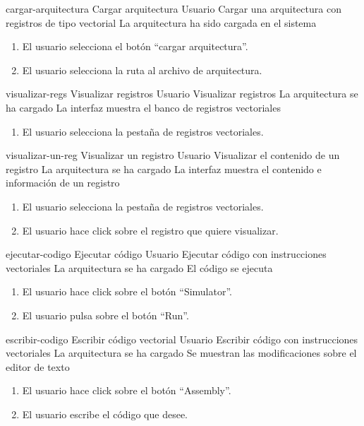\begin{useCase}{cargar-arquitectura}
  {Cargar arquitectura}
  {Usuario}
  {Cargar una arquitectura con registros de tipo vectorial}
  {\NA}
  {La arquitectura ha sido cargada en el sistema}
  \begin{enumerate}
    \item El usuario selecciona el botón ``cargar arquitectura''.
    \item El usuario selecciona la ruta al archivo de arquitectura.
  \end{enumerate}
\end{useCase}

\begin{useCase}{visualizar-regs}
  {Visualizar registros}
  {Usuario}
  {Visualizar registros}
  {La arquitectura se ha cargado}
  {La interfaz muestra el banco de registros vectoriales}
  \begin{enumerate}
    \item El usuario selecciona la pestaña de registros vectoriales.
  \end{enumerate}
\end{useCase}

\begin{useCase}{visualizar-un-reg}
  {Visualizar un registro}
  {Usuario}
  {Visualizar el contenido de un registro}
  {La arquitectura se ha cargado}
  {La interfaz muestra el contenido e información de un registro}
  \begin{enumerate}
    \item El usuario selecciona la pestaña de registros vectoriales.
    \item El usuario hace click  sobre el registro que quiere visualizar.
  \end{enumerate}
\end{useCase}

\begin{useCase}{ejecutar-codigo}
  {Ejecutar código}
  {Usuario}
  {Ejecutar código con instrucciones vectoriales}
  {La arquitectura se ha cargado}
  {El código se ejecuta}
  \begin{enumerate}
    \item El usuario hace click sobre el botón ``Simulator''.
    \item El usuario pulsa sobre el botón ``Run''.
  \end{enumerate}
\end{useCase}

\begin{useCase}{escribir-codigo}
  {Escribir código vectorial}
  {Usuario}
  {Escribir código con instrucciones vectoriales}
  {La arquitectura se ha cargado}
  {Se muestran las modificaciones sobre el editor de texto}
  \begin{enumerate}
    \item El usuario hace click sobre el botón ``Assembly''.
    \item El usuario escribe el código que desee.
  \end{enumerate}
\end{useCase}

